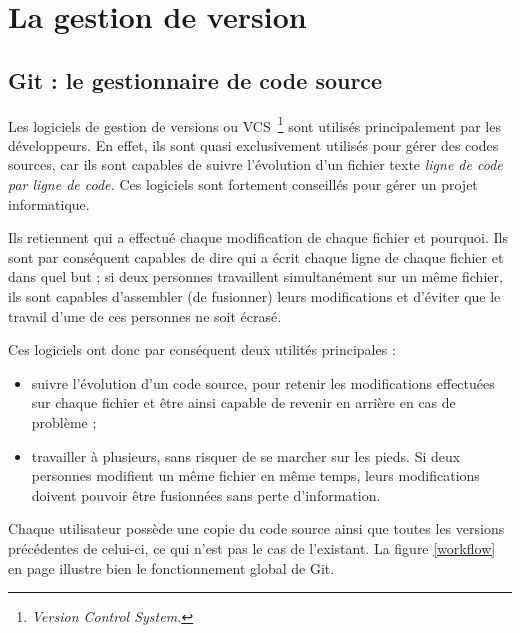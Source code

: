 \chapter{La gestion de version}

\section{Git : le gestionnaire de code source}

Les logiciels de gestion de versions ou VCS\, \footnote{\emph{Version Control
System.}} sont utilisés principalement par les développeurs. En effet, ils sont
quasi exclusivement utilisés pour gérer des codes sources, car ils sont
capables de suivre l’évolution d’un fichier texte \emph{ligne de code par ligne de
code.} Ces logiciels sont fortement conseillés pour gérer un projet
informatique.

Ils retiennent qui a effectué chaque modification de chaque fichier et
pourquoi. Ils sont par conséquent capables de dire qui a écrit chaque ligne de
chaque fichier et dans quel but ; si deux personnes travaillent simultanément
sur un même fichier, ils sont capables d’assembler (de fusionner) leurs
modifications et d’éviter que le travail d’une de ces personnes ne soit écrasé.

Ces logiciels ont donc par conséquent deux utilités principales :
\begin{itemize}
    \item suivre l’évolution d’un code source, pour retenir les modifications
effectuées sur chaque fichier et être ainsi capable de revenir en arrière en
cas de problème ;
    \item travailler à plusieurs, sans risquer de se marcher sur les pieds.
Si deux personnes modifient un même fichier en même temps, leurs modifications
doivent pouvoir être fusionnées sans perte d’information.
\end{itemize}

Chaque utilisateur possède une copie du code source ainsi que toutes les
versions précédentes de celui-ci, ce qui n'est pas le cas de l'existant. La
figure \ref{workflow} en  page \pageref{workflow} illustre bien le
fonctionnement global de Git.

